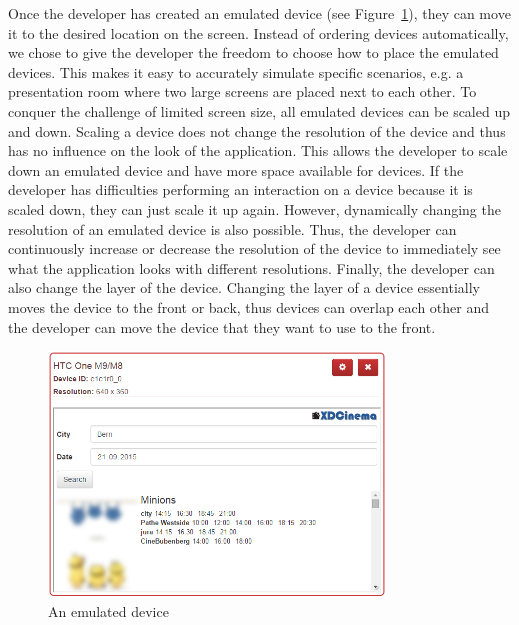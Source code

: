 Once the developer has created an emulated device (see Figure~\ref{fig:emulated_device}), they can move it to the desired location on the screen. Instead of ordering devices automatically, we chose to give the developer the freedom to choose how to place the emulated devices. This makes it easy to accurately simulate specific scenarios, e.g. a presentation room where two large screens are placed next to each other. To conquer the challenge of limited screen size, all emulated devices can be scaled up and down. Scaling a device does not change the resolution of the device and thus has no influence on the look of the application. This allows the developer to scale down an emulated device and have more space available for devices. If the developer has difficulties performing an interaction on a device because it is scaled down, they can just scale it up again. However, dynamically changing the resolution of an emulated device is also possible. Thus, the developer can continuously increase or decrease the resolution of the device to immediately see what the application looks with different resolutions. Finally, the developer can also change the layer of the device. Changing the layer of a device essentially moves the device to the front or back, thus devices can overlap each other and the developer can move the device that they want to use to the front.

\begin{figure}[H]
  \centering
    \includegraphics[width=0.8\textwidth]{images/screenshots/emulated_device_3.png}
	\caption[Screenshot: Emulated device]{An emulated device}
	\label{fig:emulated_device}
\end{figure}

